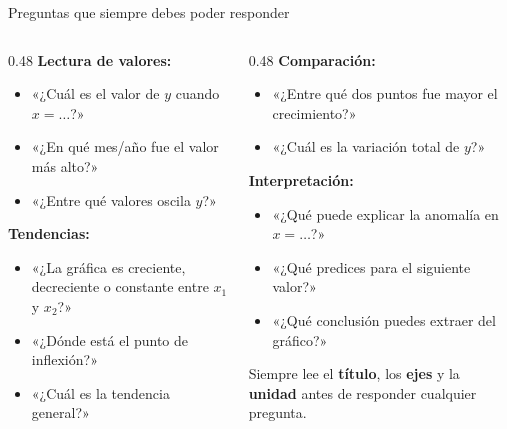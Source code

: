 \documentclass[aspectratio=169, 10pt, spanish]{beamer}
\begin{document}

\begin{frame}{Preguntas que siempre debes poder responder}
  \begin{columns}[T]
    \begin{column}{0.48\textwidth}
      \textbf{Lectura de valores:}
      \begin{itemize}
        \item «¿Cuál es el valor de $y$ cuando $x = \ldots$?»
        \item «¿En qué mes/año fue el valor más alto?»
        \item «¿Entre qué valores oscila $y$?»
      \end{itemize}
      \vspace{8pt}
      \textbf{Tendencias:}
      \begin{itemize}
        \item «¿La gráfica es creciente, decreciente
              o constante entre $x_1$ y $x_2$?»
        \item «¿Dónde está el punto de inflexión?»
        \item «¿Cuál es la tendencia general?»
      \end{itemize}
    \end{column}
    \begin{column}{0.48\textwidth}
      \textbf{Comparación:}
      \begin{itemize}
        \item «¿Entre qué dos puntos fue mayor
              el crecimiento?»
        \item «¿Cuál es la variación total de $y$?»
      \end{itemize}
      \vspace{8pt}
      \textbf{Interpretación:}
      \begin{itemize}
        \item «¿Qué puede explicar la anomalía en $x = \ldots$?»
        \item «¿Qué predices para el siguiente valor?»
        \item «¿Qué conclusión puedes extraer del gráfico?»
      \end{itemize}
      \vspace{8pt}
      \begin{notabox}[Consejo]
        \AlmFontFootnote
        Siempre lee el \textbf{título}, los
        \textbf{ejes} y la \textbf{unidad} antes
        de responder cualquier pregunta.
      \end{notabox}
    \end{column}
  \end{columns}
\end{frame}
\end{document}
